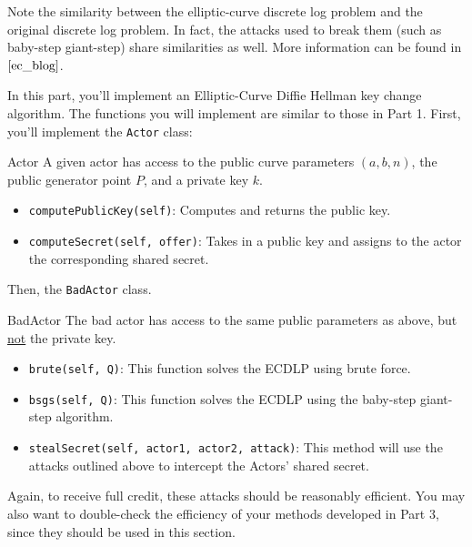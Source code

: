 \documentclass{article}
\begin{document}
    \vspace{3mm}
    Note the similarity between the elliptic-curve discrete log problem and the original discrete log problem. In fact, the attacks used to break them (such as baby-step giant-step) share similarities as well. More information can be found in $\cite{ec_blog}$.

    \begin{tcolorbox}[enhanced,interior style={top color=Plum!20,bottom color=Plum!30}]
        In this part, you'll implement an Elliptic-Curve Diffie Hellman key change algorithm. The functions you will implement are similar to those in Part 1. First, you'll implement the \lstinline{Actor} class:
    
        \begin{mybox}[
            colframe=Cerulean!50!black,
            colback=Cerulean!30,
            colbacktitle=Cerulean!,
            coltitle=Cerulean!30!black
            ]{Actor}
            A given actor has access to the public curve parameters $(a, b, n)$, the public generator point $P$, and a private key $k$.
            \begin{itemize}
                \item \lstinline{computePublicKey(self)}: Computes and returns the public key.
                \item \lstinline{computeSecret(self, offer)}: Takes in a public key and assigns to the actor the corresponding shared secret.
            \end{itemize}
        \end{mybox}
    
        Then, the \lstinline{BadActor} class.
    
        \begin{mybox}[
            colframe=purple!50!black,
            colback=purple!30,
            colbacktitle=purple!50!white,
            coltitle=purple!30!black,
            ]{BadActor}
            The bad actor has access to the same public parameters as above, but \underline{not} the private key.
            \begin{itemize}
                \item \lstinline{brute(self, Q)}: This function solves the ECDLP using brute force.
                \item \lstinline{bsgs(self, Q)}: This function solves the ECDLP using the baby-step giant-step algorithm.
                \item \lstinline{stealSecret(self, actor1, actor2, attack)}: This method will use the attacks outlined above to intercept the Actors' shared secret.
            \end{itemize}
        \end{mybox}
        Again, to receive full credit, these attacks should be reasonably efficient. You may also want to double-check the efficiency of your methods developed in Part 3, since they should be used in this section.
    \end{tcolorbox}
\end{document}
